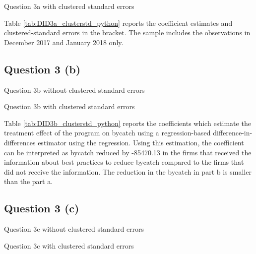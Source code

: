 \documentclass{article}
\begin{document}
\begin{table}[ht]
    \centering
    
    \caption{Question 3a with clustered standard errors }
    \label{tab:DID3a_clusterstd_python}
\end{table}

Table \ref{tab:DID3a_clusterstd_python} reports the coefficient estimates and clustered-standard errors in the bracket. The sample includes the observations in December 2017 and January
2018 only. 

\newpage

\subsection{Question 3 (b)}
\begin{table}[ht]
    \centering
    
    \caption{Question 3b without clustered standard errors }
    \label{tab:DID3b_python}
\end{table}

\begin{table}[ht]
    \centering
    
    \caption{Question 3b with clustered standard errors }
    \label{tab:DID3b_clusterstd_python}
\end{table}

Table \ref{tab:DID3b_clusterstd_python} reports the coefficients which estimate the treatment effect of the program on bycatch using a regression-based difference-in-differences estimator using the regression. Using this estimation, the coefficient can be interpreted as bycatch reduced by -85470.13 in the firms that received the information about best practices to reduce bycatch compared to the firms that did not receive the information. The reduction in the bycatch in part b is smaller than the part a.

\newpage

\subsection{Question 3 (c)}
\begin{table}[ht]
    \centering
    
    \caption{Question 3c without clustered standard errors }
    \label{tab:DID3c_python}
\end{table}

\begin{table}[ht]
    \centering
    
    \caption{Question 3c with clustered standard errors }
    \label{tab:DID3c_clusterstd_python}
\end{table}
\end{document}
